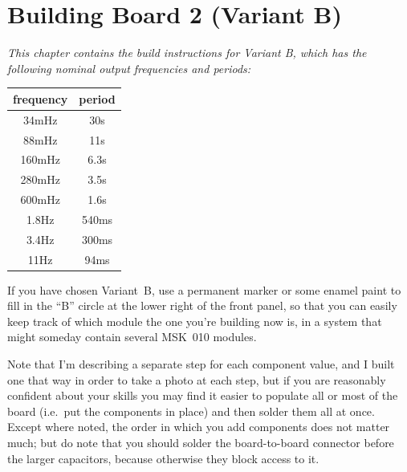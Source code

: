 
%
%
%
%
%
%

\chapter{Building Board 2 (Variant B)}

\emph{This chapter contains the build instructions for Variant B, which has
the following nominal output frequencies and periods:}

\begin{tabular}{cc}
frequency & period \\ \hline
34mHz & 30s \\
88mHz & 11s \\
160mHz & 6.3s \\
280mHz & 3.5s \\
600mHz & 1.6s \\
1.8Hz & 540ms \\
3.4Hz & 300ms \\
11Hz & 94ms
\end{tabular}

If you have chosen Variant~B, use a permanent marker or some enamel paint to
fill in the ``B'' circle at the lower right of the front panel, so that you
can easily keep track of which module the one you're building now is, in a
system that might someday contain several MSK~010 modules.

Note that I'm describing a separate step for each component value,
and I built one that way in order to take a photo at each step, but if you
are reasonably confident about your skills you may find it easier to
populate all or most of the board (i.e.\ put the components in place) and
then solder them all at once.  Except where noted, the order in which you
add components does not matter much; but do note that you should solder the
board-to-board connector before the larger capacitors, because otherwise
they block access to it.

